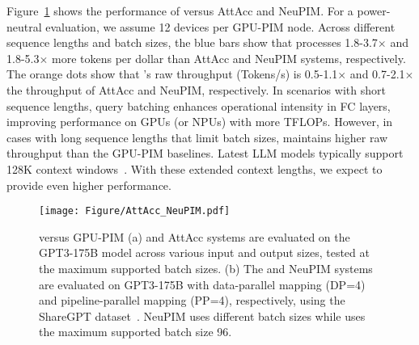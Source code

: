 Figure~\ref{fig:AttAcc_NeuPIM} shows the performance of \att{} versus AttAcc and NeuPIM.
For a power-neutral evaluation, we assume 12 \att{} devices per GPU-PIM node. Across different sequence lengths and batch sizes, the blue bars show that \att{} processes 1.8-3.7$\times$ and 1.8-5.3$\times$ more tokens per dollar than AttAcc and NeuPIM systems, respectively. The orange dots show that \att{}'s raw throughput (Tokens/s) is 0.5-1.1$\times$ and 0.7-2.1$\times$ the throughput of AttAcc and NeuPIM, respectively. 
In scenarios with short sequence lengths, query batching enhances operational intensity in FC layers, improving performance on GPUs (or NPUs) with more TFLOPs. However, in cases with long sequence lengths that limit batch sizes, \att{} maintains higher raw throughput than the GPU-PIM baselines. Latest LLM models typically support 128K context windows~\cite{gpt4-turbo}. With these extended context lengths, we expect \att{} to provide even higher performance.


\begin{figure}[t]
	\centering
  	\texttt{[image: Figure/AttAcc\_NeuPIM.pdf]}
	\caption{\att{} versus GPU-PIM (a) \att{} and AttAcc systems are evaluated on the GPT3-175B model across various input and output sizes, tested at the maximum supported batch sizes. 
 (b) The \att{} and NeuPIM systems are evaluated on GPT3-175B with data-parallel mapping (DP=4) and pipeline-parallel mapping (PP=4), respectively, using the ShareGPT dataset~\cite{sharegpt}. NeuPIM uses different batch sizes while \att{} uses the maximum supported batch size 96.}
\label{fig:AttAcc_NeuPIM}
\end{figure}

